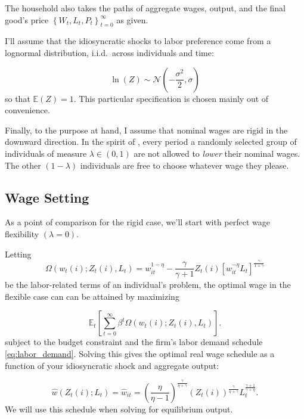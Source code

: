 \documentclass[12pt,a4paper]{scrartcl}            %
\begin{document}
The household also takes the paths of aggregate wages, output, and the final good's price $\left\{W_t, L_t, P_t \right\}_{t=0}^{\infty}$ as given.

I'll assume that the idiosyncratic shocks to labor preference come from a lognormal distribution, i.i.d.\ across individuals and time:

\begin{equation}
    \label{eq:shock_dist}
    \ln(Z) \sim \mathcal{N}\left(-\frac{\sigma^2}{2}, \sigma\right)
\end{equation}
%
so that $\mathbb{E}(Z) = 1$.
This particular specification is chosen mainly out of convenience.


Finally, to the purpose at hand, I assume that nominal wages are rigid in the downward direction.
In the spirit of \cite{calvo_1983}, every period a randomly selected group of individuals of measure $\lambda \in \left(0, 1\right)$ are not allowed to \emph{lower} their nominal wages.
The other $\left(1 - \lambda \right)$ individuals are free to choose whatever wage they please.
\subsection{Wage Setting}
\label{sub:wage_setting}

As a point of comparison for the rigid case, we'll start with perfect wage flexibility $(\lambda = 0)$.

Letting
\begin{equation}
    \label{eq:labor_part}
    \Omega( w_t(i); Z_t(i), L_t ) = w_{it}^{1 - \eta} - \frac{\gamma}{\gamma + 1}Z_t(i)\left[ w_{it}^{-\eta}L_t \right]^{\frac{\gamma}{1 + \gamma}}
\end{equation}
%
be the labor-related terms of an individual's problem, the optimal wage in the flexible case can can be attained by maximizing

\begin{equation}
    \label{eq:labor_opt}
    \mathbb{E}_t\left[\sum_{t=0}^{\infty}\beta^t \Omega( w_t(i); Z_t(i), L_t ) \right].
\end{equation}
%
subject to the budget constraint and the firm's labor demand schedule \eqref{eq:labor_demand}.
Solving this gives the optimal real wage schedule as a function of your idiosyncratic shock and aggregate output:

\begin{equation}
    \label{eq:flex}
    \hat{w}(Z_t(i); L_t) = \hat{w}_{it} = \left( \frac{\eta}{\eta - 1} \right)^{\frac{\gamma}{\eta + \gamma}}\left( Z_t(i) \right)^{\frac{\gamma}{\eta + \gamma}} L_t^{\frac{\gamma + 1}{\gamma + \eta}}.
\end{equation}
%
We will use this schedule when solving for equilibrium output.
\end{document}
